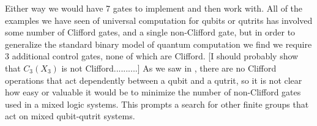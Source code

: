 Either way we would have 7 gates to implement and then work with. All of the examples we have seen of universal computation for qubits or qutrits has involved some number of Clifford gates, and a single non-Clifford gate, but in order to generalize the standard binary model of quantum computation we find we require 3 additional control gates, none of which are Clifford. [I should probably show that $C_3(X_3)$ is not Clifford..........] As we saw in \cite{tolar-clifford}, there are no Clifford operations that act dependently between a qubit and a qutrit, so it is not clear how easy or valuable it would be to minimize the number of non-Clifford gates used in a mixed logic systems. This prompts a search for other finite groups that act on mixed qubit-qutrit systems.
